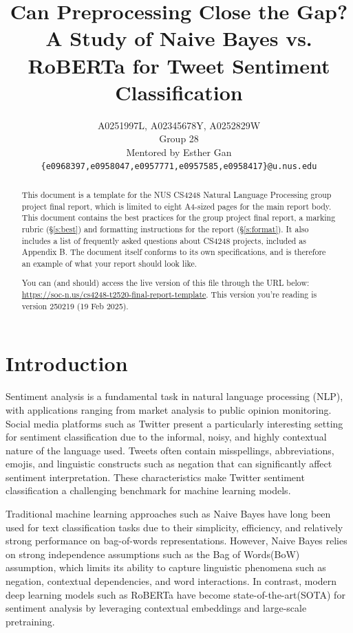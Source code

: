 \documentclass[11pt]{article}
\title{Can Preprocessing Close the Gap? A Study of Naive Bayes vs. RoBERTa for Tweet Sentiment Classification}
\author{A0251997L, A02345678Y, A0252829W \\
  Group 28 \\
  Mentored by Esther Gan \\
  \texttt{\{e0968397,e0958047,e0957771,e0957585,e0958417\}@u.nus.edu}}
\begin{document}
\maketitle
\begin{abstract}
This document is a template for the NUS CS4248 Natural Language Processing group project final report, which is limited to eight A4-sized pages for the main report body. This document contains the best practices for the group project final report, a marking rubric (\S\ref{s:best}) and formatting instructions for the report (\S\ref{s:format}).  It also includes a list of frequently asked questions about CS4248 projects, included as Appendix B. 
The document itself conforms to its own specifications, and is therefore an example of what your report should look like.  

You can (and should) access the live version of this file through the URL below:
\url{https://soc-n.us/cs4248-t2520-final-report-template}.  This version you're reading is version 250219 (19 Feb 2025).
\end{abstract}

\section{Introduction}

Sentiment analysis is a fundamental task in natural language processing (NLP), with applications ranging from market analysis to public opinion monitoring. Social media platforms such as Twitter present a particularly interesting setting for sentiment classification due to the informal, noisy, and highly contextual nature of the language used. Tweets often contain misspellings, abbreviations, emojis, and linguistic constructs such as negation that can significantly affect sentiment interpretation. These characteristics make Twitter sentiment classification a challenging benchmark for machine learning models.

Traditional machine learning approaches such as Naive Bayes have long been used for text classification tasks due to their simplicity, efficiency, and relatively strong performance on bag-of-words representations. However, Naive Bayes relies on strong independence assumptions such as the Bag of Words(BoW) assumption, which limits its ability to capture linguistic phenomena such as negation, contextual dependencies, and word interactions. In contrast, modern deep learning models such as RoBERTa have become state-of-the-art(SOTA) for sentiment analysis by leveraging contextual embeddings and large-scale pretraining.
\end{document}
